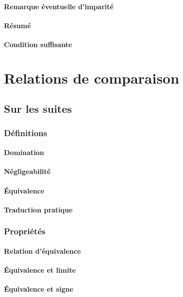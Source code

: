 \documentclass[12pt,a4paper,french]{book}
\begin{document}
			\subsubsection{Remarque éventuelle d'imparité}
			\subsubsection{Résumé}
			\subsubsection{Condition suffisante}
			
\chapter{Relations de comparaison}
	\section{Sur les suites}
		\subsection{Définitions}
			\subsubsection{Domination}
			\subsubsection{Négligeabilité}
			\subsubsection{Équivalence}
			\subsubsection{Traduction pratique}
		\subsection{Propriétés}
			\subsubsection{Relation d'équivalence}
			\subsubsection{Équivalence et limite}
			\subsubsection{Équivalence et signe}
\end{document}
